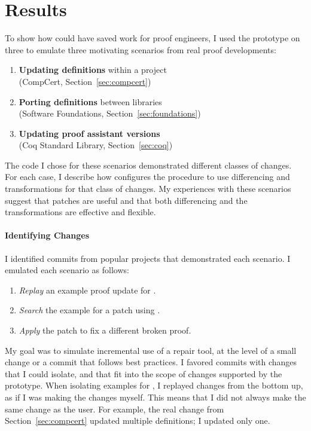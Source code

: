 \section{Results}
\label{sec:pumpkin-results}



To show how \sysname could have saved work for proof engineers, I used the \sysname prototype on three  to emulate three motivating scenarios from real proof developments:

\begin{enumerate}
\item \textbf{Updating definitions} within a project \\
(CompCert, Section~\ref{sec:compcert})
\item \textbf{Porting definitions} between libraries \\
(Software Foundations, Section~\ref{sec:foundations})
\item \textbf{Updating proof assistant versions} \\
(Coq Standard Library, Section~\ref{sec:coq})
\end{enumerate}
The code I chose for these scenarios demonstrated different classes of changes.
For each case, I describe how \sysname configures the procedure to use differencing and transformations for that class of changes.
My experiences with these scenarios suggest that patches are useful and that both differencing and the transformations 
are effective and flexible.

\paragraph{Identifying Changes} I identified commits from popular projects that
demonstrated each scenario.
I emulated each scenario as follows:

\begin{enumerate}
\item \textit{Replay} an example proof update for \sysname.
\item \textit{Search} the example for a patch using \sysname.
\item \textit{Apply} the patch to fix a different broken proof.
\end{enumerate}
My goal was to simulate incremental use of a repair tool,
at the level of a small change or a commit that follows best practices.
I favored commits with changes that I could isolate,
and that fit into the scope of changes supported by the \sysname prototype.
When isolating examples for \sysname, I replayed changes from the bottom up,
as if I was making the changes myself.
This means that I did not always make the same change as the user. For example,
the real change from Section~\ref{sec:compcert} updated multiple definitions;
I updated only one.

